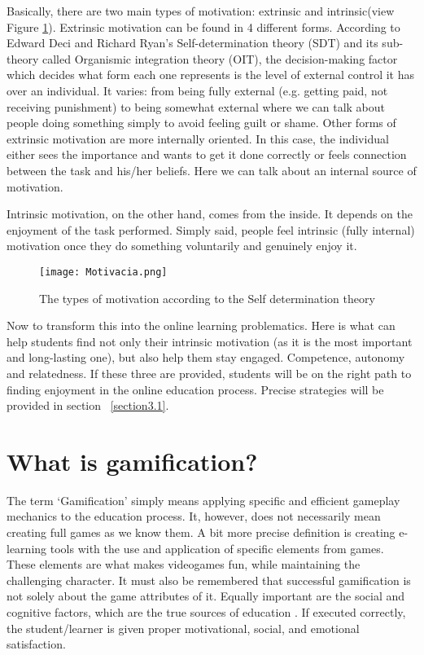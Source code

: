 \documentclass[10pt,english,a4paper]{article}
\begin{document}
	Basically, there are two main types of motivation: extrinsic and intrinsic(view Figure \ref{fig:motivation}). Extrinsic motivation can be found in 4 different forms. 
	According to Edward Deci and Richard Ryan's Self-determination theory (SDT) and its sub-theory called Organismic integration theory (OIT), the decision-making factor which decides what form each one represents is the level of external control it has over an individual. 
	It varies: from being fully external (e.g. getting paid, not receiving punishment) to being somewhat external where we can talk about people doing something simply to avoid feeling guilt or shame. Other forms of extrinsic motivation are more internally oriented. 
	In this case, the individual either sees the importance and wants to get it done correctly or feels connection between the task and his/her beliefs. Here we can talk about an internal source of motivation.
	
	Intrinsic motivation, on the other hand, comes from the inside. It depends on the enjoyment of the task performed. Simply said, people feel intrinsic (fully internal) motivation once they do something voluntarily and genuinely enjoy it.

	\begin{figure}[hp]
		\centering
		\texttt{[image: Motivacia.png]}
		\caption{\small The types of motivation according to the Self determination theory}
		\label{fig:motivation}
	\end{figure}
	
	Now to transform this into the online learning problematics. Here is what can help students find not only their intrinsic motivation (as it is the most important and long-lasting one), but also help them stay engaged. 
	Competence, autonomy and relatedness. If these three are provided, students will be on the right path to finding enjoyment in the online education process\cite{Guyan}. Precise strategies will be provided in section ~\ref{section3.1}.

\section{What is gamification?} \label{section3}
	The term ‘Gamification’ simply means applying specific and efficient gameplay mechanics to the education process. It, however, does not necessarily mean creating full games as we know them\cite{Raymer}.
	A bit more precise definition is creating e-learning tools with the use and application of specific elements from games. These elements are what makes videogames fun, while maintaining the challenging character\cite{Abu-Dawood}. 
	It must also be remembered that successful gamification is not solely about the game attributes of it. Equally important are the social and cognitive factors, which are the true sources of education \cite{Raymer}.
	If executed correctly, the student/learner is given proper motivational, social, and emotional satisfaction\cite{Abu-Dawood}. 
	
\end{document}
